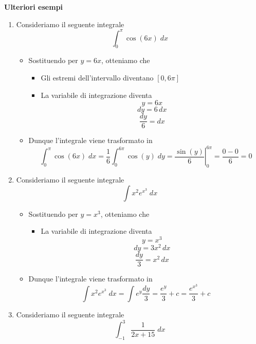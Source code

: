 \documentclass[a4paper, 12pt]{report}
\begin{document}
    \quad
    
    \textbf{Ulteriori esempi}
    \begin{enumerate}
        \item Consideriamo il seguente integrale
        \[ \int_{0}^{\pi} \cos(6x) \; dx\]
        
        \begin{itemize}
        \item Sostituendo per $y=6x$, otteniamo che
            \begin{itemize}
                \item Gli estremi dell'intervallo diventano $[0, 6\pi]$
                \item La variabile di integrazione diventa
                \[ y = 6x\]
                \[ dy = 6 \, dx\]
                \[\frac{dy}{6} = dx\]
            \end{itemize}
        \item Dunque l'integrale viene trasformato in
        \[ \int_{0}^{\pi} \cos(6x) \; dx = \frac{1}{6} \int_{0}^{6\pi} \cos(y) \; dy = \left . \frac{\sin(y)}{6} \right |_{0}^{6\pi} = \frac{0 - 0}{6} = 0\]
        
        \end{itemize}
        
        \item Consideriamo il seguente integrale
        \[ \int x^2 e^{x^3} \; dx\]
        
        \begin{itemize}
        \item Sostituendo per $y=x^3$, otteniamo che
            \begin{itemize}
                \item La variabile di integrazione diventa
                \[ y = x^3\]
                \[ dy = 3x^2 \, dx\]
                \[ \frac{dy}{3} = x^2 \, dx\]
            \end{itemize}
            
        \item Dunque l'integrale viene trasformato in
        \[ \int x^2 e^{x^3} \; dx = \int e^y \frac{dy}{3} = \frac{e^y}{3} +c = \frac{e^{x^3}}{3}+c\]
        
        \end{itemize}
        
        \item Consideriamo il seguente integrale
        \[ \int_{-1}^{3} \frac{1}{2x+15} \; dx\]
        

\end{enumerate}
\end{document}
